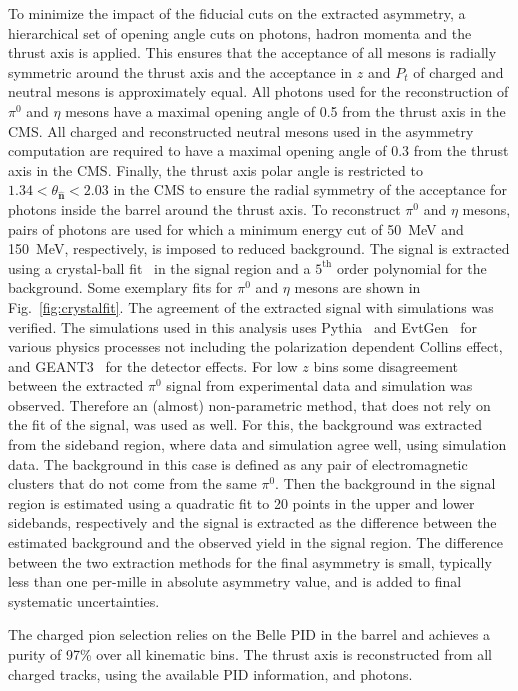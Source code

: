 \documentclass[aps,prX,preprint,groupedaddress,linenumbers]{revtex4-1}
\begin{document}
To minimize the impact of the fiducial cuts on the extracted asymmetry, a hierarchical set of opening angle cuts on photons, hadron momenta and the thrust axis is applied. This ensures that the acceptance of all mesons is radially symmetric around the thrust axis and the acceptance in $z$ and $P_t$ of charged and neutral mesons is approximately equal. All photons used for the reconstruction of $\pi^0$ and $\eta$ mesons have a maximal opening angle of 0.5 from the thrust axis in the CMS. All charged and reconstructed neutral mesons used in the asymmetry computation are required to have a maximal opening angle of 0.3 from the thrust axis in the CMS. Finally, the thrust axis polar angle is restricted to $1.34< \theta_{\boldsymbol{\hat{n}}} < 2.03$ in the CMS to ensure the radial symmetry of the acceptance for photons inside the barrel around the thrust axis. 
To reconstruct $\pi^0$ and $\eta$ mesons, pairs of photons are used for which a minimum energy cut of 50~MeV and 150~MeV, respectively, is imposed to reduced background.  The signal is extracted using a crystal-ball fit~\cite{CrystalBallFunc} in the signal region and a $5^\textrm{th}$ order polynomial for the background. Some exemplary fits for $\pi^0$ and $\eta$ mesons are shown in Fig.~\ref{fig:crystalfit}. The agreement of the extracted signal with simulations was verified. 
The simulations used in this analysis uses Pythia~\cite{Sjostrand:2006za} and EvtGen~\cite{Lange:2001uf} for various physics processes not including the polarization dependent Collins effect, and GEANT3~\cite{Brun:1987ma} for the detector effects.  
For low $z$ bins some disagreement between the extracted $\pi^0$ signal from experimental data and simulation was observed. Therefore an (almost) non-parametric method, that does not rely on the fit of the signal, was used as well. For this, the background was extracted from the sideband region, where data and simulation agree well, using simulation data. The background in this case is defined as any pair of electromagnetic clusters that do not come from the same $\pi^0$.
Then the background in the signal region is estimated using a quadratic fit to 20 points in the upper and lower sidebands, respectively and the signal is extracted as the difference between the estimated background and the observed yield in the signal region. The difference between the two extraction methods for the final asymmetry is small, typically less than one per-mille in absolute asymmetry value, and is added to final systematic uncertainties.

The charged pion selection relies on the Belle PID in the barrel and achieves a purity of 97\% over all kinematic bins.
The thrust axis is reconstructed from all charged tracks, using the available PID information, and photons.
\end{document}
